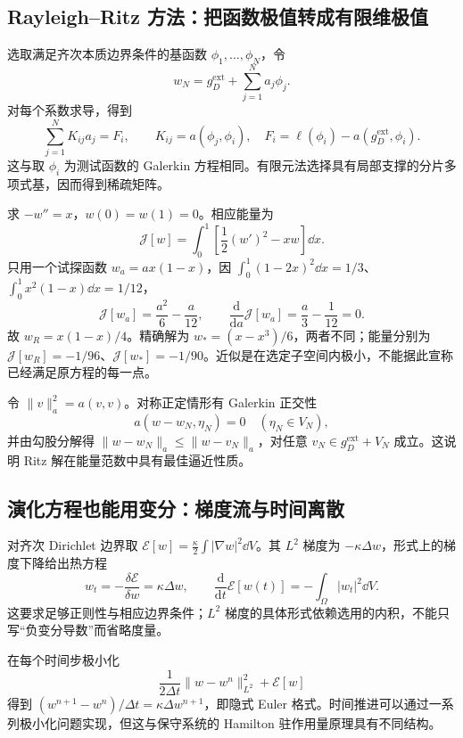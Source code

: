 \subsection{Rayleigh--Ritz 方法：把函数极值转成有限维极值}

选取满足齐次本质边界条件的基函数 $\phi_1,\ldots,\phi_N$，令
\begin{equation}
 w_N=g_D^{\mathrm{ext}}+\sum_{j=1}^Na_j\phi_j.
\end{equation}
对每个系数求导，得到
\begin{equation}
 \sum_{j=1}^NK_{ij}a_j=F_i,\qquad
 K_{ij}=a(\phi_j,\phi_i),\quad
 F_i=\ell(\phi_i)-a(g_D^{\mathrm{ext}},\phi_i).
\end{equation}
这与取 $\phi_i$ 为测试函数的 Galerkin 方程相同。有限元法选择具有局部支撑的分片多项式基，因而得到稀疏矩阵。

\begin{example}
求 $-w''=x$，$w(0)=w(1)=0$。相应能量为
\begin{equation}
 \mathcal J[w]=\int_0^1\left[\frac12(w')^2-xw\right]\dd x.
\end{equation}
只用一个试探函数 $w_a=a x(1-x)$，因 $\int_0^1(1-2x)^2\dd x=1/3$、$\int_0^1x^2(1-x)\dd x=1/12$，
\begin{equation}
 \mathcal J[w_a]=\frac{a^2}{6}-\frac a{12},\qquad
 \frac{\mathrm d}{\mathrm da}\mathcal J[w_a]=\frac a3-\frac1{12}=0.
\end{equation}
故 $w_R=x(1-x)/4$。精确解为 $w_*=(x-x^3)/6$，两者不同；能量分别为 $\mathcal J[w_R]=-1/96$、$\mathcal J[w_*]=-1/90$。近似是在选定子空间内极小，不能据此宣称已经满足原方程的每一点。
\end{example}

令 $\|v\|_a^2=a(v,v)$。对称正定情形有 Galerkin 正交性
\begin{equation}
 a(w-w_N,\eta_N)=0\quad(\eta_N\in V_N),
\end{equation}
并由勾股分解得 $\|w-w_N\|_a\le\|w-v_N\|_a$，对任意 $v_N\in g_D^{\mathrm{ext}}+V_N$ 成立。这说明 Ritz 解在能量范数中具有最佳逼近性质。

\subsection{演化方程也能用变分：梯度流与时间离散}

对齐次 Dirichlet 边界取 $\mathcal E[w]=\frac\kappa2\int|\nabla w|^2\dd V$。其 $L^2$ 梯度为 $-\kappa\Delta w$，形式上的梯度下降给出热方程
\begin{equation}
 w_t=-\frac{\delta\mathcal E}{\delta w}=\kappa\Delta w,
 \qquad \frac{\mathrm d}{\mathrm dt}\mathcal E[w(t)]
 =-\int_\Omega|w_t|^2\dd V.
\end{equation}
这要求足够正则性与相应边界条件；$L^2$ 梯度的具体形式依赖选用的内积，不能只写“负变分导数”而省略度量。

在每个时间步极小化
\begin{equation}
 \frac1{2\Delta t}\|w-w^n\|_{L^2}^2+\mathcal E[w]
\end{equation}
得到 $(w^{n+1}-w^n)/\Delta t=\kappa\Delta w^{n+1}$，即隐式 Euler 格式。时间推进可以通过一系列极小化问题实现，但这与保守系统的 Hamilton 驻作用量原理具有不同结构。
